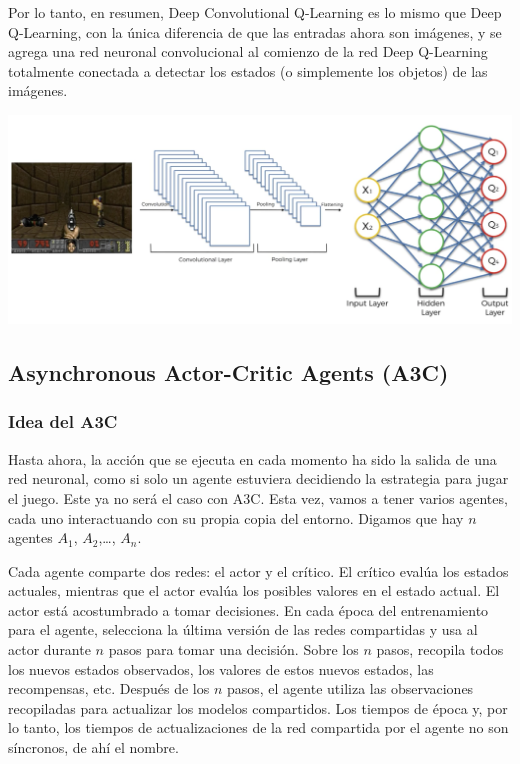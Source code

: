 \documentclass[]{book}
\begin{document}
Por lo tanto, en resumen, Deep Convolutional Q-Learning es lo mismo que Deep Q-Learning, con la única diferencia de que las entradas ahora son imágenes, y se agrega una red neuronal convolucional al comienzo de la red Deep Q-Learning totalmente conectada a detectar los estados (o simplemente los objetos) de las imágenes.

\includegraphics{Images/DCQL.png}

\hypertarget{asynchronous-actor-critic-agents-a3c}{%
\subsection{Asynchronous Actor-Critic Agents (A3C)}\label{asynchronous-actor-critic-agents-a3c}}

\hypertarget{idea-del-a3c}{%
\subsubsection{Idea del A3C}\label{idea-del-a3c}}

Hasta ahora, la acción que se ejecuta en cada momento ha sido la salida de una red neuronal, como si solo un agente estuviera decidiendo la estrategia para jugar el juego. Este ya no será el caso con A3C. Esta vez, vamos a tener varios agentes, cada uno interactuando con su propia copia del entorno. Digamos que hay \(n\) agentes \(A_1\), \(A_2\),\ldots{}, \(A_n\).

Cada agente comparte dos redes: el actor y el crítico. El crítico evalúa los estados actuales, mientras que el actor evalúa los posibles valores en el estado actual. El actor está acostumbrado a tomar decisiones. En cada época del entrenamiento para el agente, selecciona la última versión de las redes compartidas y usa al actor durante \(n\) pasos para tomar una decisión. Sobre los \(n\) pasos, recopila todos los nuevos estados observados, los valores de estos nuevos estados, las recompensas, etc. Después de los \(n\) pasos, el agente utiliza las observaciones recopiladas para actualizar los modelos compartidos. Los tiempos de época y, por lo tanto, los tiempos de actualizaciones de la red compartida por el agente no son síncronos, de ahí el nombre.
\end{document}

